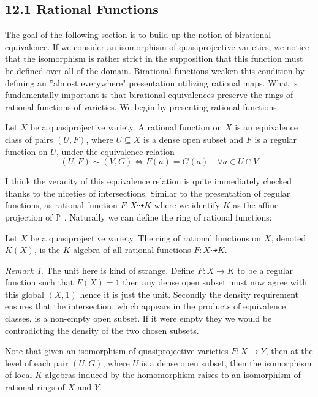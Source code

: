 \documentclass[40pt]{article}
\newcommand{\Proj}{\mathbb{P}}
\newcommand{\todash}{\dashrightarrow}
\theoremstyle{remark}
\newtheorem{remark}[theorem]{Remark}
\begin{document}
		\subsection{12.1 Rational Functions}
		The goal of the following section is to build up the notion of birational equivalence. If we consider an isomorphism of quasiprojective varieties, we notice that the isomorphism is rather strict in the supposition that this function must be defined over all of the domain. Birational functions weaken this condition by defining an ''almost everywhere" presentation utilizing rational maps. What is fundamentally important is that birational equivalences preserve the rings of rational functions of varieties. We begin by presenting rational functions.
		\begin{newdef}
			Let $X$ be a quasiprojective variety. A rational function on $X$ is an equivalence class of pairs $(U,F)$, where $U\subseteq X$ is a dense open subset and $F$ is a regular function on $U$, under the equivalence relation
			\[
			(U,F)\sim (V,G) \iff F(a)=G(a)\quad \forall a \in U \cap V
			\]
		\end{newdef}
		I think the veracity of this equivalence relation is quite immediately checked thanks to the niceties of intersections. Similar to the presentation of regular functions, as rational function $F : X \todash K$ where we identify $K$ as the affine projection of $\Proj^1$.
		Naturally we can define the ring of rational functions:
		\begin{newdef}
			Let $X$ be a quasiprojective variety. The ring of rational functions on $X$, denoted $K(X)$, is the $K$-algebra of all rational functions $F:X \todash K$. 
		\end{newdef}
		\begin{remark}
			The unit here is kind of strange. Define $F: X \to K$ to be a regular function such that $F(X) = 1$ then any dense open subset must now agree with this global $(X,1)$ hence it is just the unit. Secondly the density requirement ensures that the intersection, which appears in the products of equivalence classes, is a non-empty open subset. If it were empty they we would be contradicting the density of the two chosen subsets. 
		\end{remark}
		Note that given an isomorphism of quasiprojective varieties $F : X \to Y$, then at the level of each pair $(U,G)$, where $U$ is a dense open subset, then the isomorphism of local $K$-algebras induced by the homomorphism raises to an isomorphism of rational rings of $X$ and $Y$. 
\end{document}
